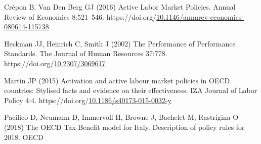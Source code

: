 \documentclass[
  11pt]{article}
\newlength{\cslhangindent}
\newenvironment{CSLReferences}[2] %
 {\begin{list}{}{%
  \setlength{\itemindent}{0pt}
  \setlength{\leftmargin}{0pt}
  \setlength{\parsep}{0pt}
  \ifodd #1
   \setlength{\leftmargin}{\cslhangindent}
   \setlength{\itemindent}{-1\cslhangindent}
  \fi
  \setlength{\itemsep}{#2\baselineskip}}}
 {\end{list}}
\begin{document}
\label{refs}
\begin{CSLReferences}{1}{1}
Crépon B, Van Den Berg GJ (2016) Active {Labor Market Policies}. Annual
Review of Economics 8:521--546.
https://doi.org/\href{https://doi.org/10.1146/annurev-economics-080614-115738}{10.1146/annurev-economics-080614-115738}

Heckman JJ, Heinrich C, Smith J (2002) The {Performance} of {Performance
Standards}. The Journal of Human Resources 37:778.
https://doi.org/\href{https://doi.org/10.2307/3069617}{10.2307/3069617}

Martin JP (2015) Activation and active labour market policies in {OECD}
countries: Stylised facts and evidence on their effectiveness. IZA
Journal of Labor Policy 4:4.
https://doi.org/\href{https://doi.org/10.1186/s40173-015-0032-y}{10.1186/s40173-015-0032-y}

Pacifico D, Neumann D, Immervoll H, Browne J, Bachelet M, Rastrigina O
(2018) The {OECD Tax-Benefit} model for {Italy}. {Description} of policy
rules for 2018. OECD

\end{CSLReferences}
\end{document}
